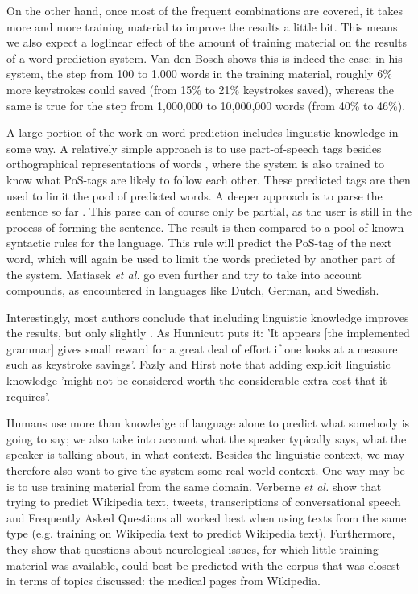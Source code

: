 \documentclass[11pt]{article}
\begin{document}
On the other hand, once most of the frequent combinations are covered, it takes more and more training material to improve the results a little bit. This means we also expect a loglinear effect of the amount of training material on the results of a word prediction system. Van den Bosch  shows this is indeed the case: in his system, the step from 100 to 1,000 words in the training material, roughly 6\% more keystrokes could saved (from 15\% to 21\% keystrokes saved), whereas the same is true for the step from 1,000,000 to 10,000,000 words (from 40\% to 46\%).

A large portion of the work on word prediction includes linguistic knowledge in some way. A relatively simple approach is to use part-of-speech tags besides orthographical representations of words \cite{carlberger+97,Fazly+03,copestake97}, where the system is also trained to know what PoS-tags are likely to follow each other. These predicted tags are then used to limit the pool of predicted words. A deeper approach is to parse the sentence so far \cite{Matiasek+02,garay-vitoria+97}. This parse can of course only be partial, as the user is still in the process of forming the sentence. The result is then compared to a pool of known syntactic rules for the language. This rule will predict the PoS-tag of the next word, which will again be used to limit the words predicted by another part of the system. Matiasek {\em et al.}  go even further and try to take into account compounds, as encountered in languages like Dutch, German, and Swedish. 

Interestingly, most authors conclude that including linguistic knowledge improves the results, but only slightly \cite{garay-vitoria+97,Fazly+03}. As Hunnicutt  puts it: 'It appears [the implemented grammar] gives small reward for a great deal of effort if one looks at a measure such as keystroke savings'. Fazly and Hirst  note that adding explicit linguistic knowledge 'might not be considered worth the considerable extra cost that it requires'.

Humans use more than knowledge of language alone to predict what somebody is going to say; we also take into account what the speaker typically says, what the speaker is talking about, in what context. Besides the linguistic context, we may therefore also want to give the system some real-world context. One way may be is to use training material from the same domain. Verberne {\em et al.}  show that trying to predict Wikipedia text, tweets, transcriptions of conversational speech and Frequently Asked Questions all worked best when using texts from the same type (e.g. training on Wikipedia text to predict Wikipedia text). Furthermore, they show that questions about neurological issues, for which little training material was available, could best be predicted with the corpus that was closest in terms of topics discussed: the medical pages from Wikipedia. 
\end{document}

